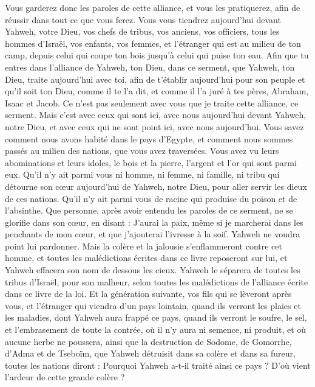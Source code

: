 \begin{multicols}{2}
Vous garderez donc les paroles de cette alliance, et vous les pratiquerez, afin de réussir dans tout ce que vous ferez.
Vous vous tiendrez aujourd'hui devant Yahweh, votre Dieu, vos chefs de tribus, vos anciens, vos officiers, tous les hommes d'Israël,
vos enfants, vos femmes, et l’étranger qui est au milieu de ton camp, depuis celui qui coupe ton bois jusqu'à celui qui puise ton eau.
Afin que tu entres dans l'alliance de Yahweh, ton Dieu, dans ce serment, que Yahweh, ton Dieu, traite aujourd'hui avec toi,
afin de t’établir aujourd'hui pour son peuple et qu'il soit ton Dieu, comme il te l’a dit, et comme il l’a juré à tes pères, Abraham, Isaac et Jacob.
Ce n'est pas seulement avec vous que je traite cette alliance, ce serment.
Mais c'est avec ceux qui sont ici, avec nous aujourd'hui devant Yahweh, notre Dieu, et avec ceux qui ne sont point ici, avec nous aujourd'hui.
Vous savez comment nous avons habité dans le pays d'Egypte, et comment nous sommes passés au milieu des nations, que vous avez traversées.
Vous avez vu leurs abominations et leurs idoles, le bois et la pierre, l'argent et l'or qui sont parmi eux.
Qu'il n'y ait parmi vous ni homme, ni femme, ni famille, ni tribu qui détourne son cœur aujourd'hui de Yahweh, notre Dieu, pour aller servir les dieux de ces nations. Qu'il n'y ait parmi vous de racine qui produise du poison et de l'absinthe.
Que personne, après avoir entendu les paroles de ce serment, ne se glorifie dans son cœur, en disant : J'aurai la paix, même si je marcherai dans les penchants de mon cœur, et que j’ajouterai l’ivresse à la soif.
Yahweh ne voudra point lui pardonner. Mais la colère et la jalousie s'enflammeront contre cet homme, et toutes les malédictions écrites dans ce livre reposeront sur lui, et Yahweh effacera son nom de dessous les cieux.
Yahweh le séparera de toutes les tribus d'Israël, pour son malheur, selon toutes les malédictions de l'alliance écrite dans ce livre de la loi.
Et la génération suivante, vos fils qui se lèveront après vous, et l’étranger qui viendra d'un pays lointain, quand ils verront les plaies et les maladies, dont Yahweh aura frappé ce pays,
quand ils verront le soufre, le sel, et l’embrasement de toute la contrée, où il n’y aura ni semence, ni produit, et où aucune herbe ne poussera, ainsi que la destruction de Sodome, de Gomorrhe, d'Adma et de Tseboïm, que Yahweh détruisit dans sa colère et dans sa fureur,
toutes les nations diront : Pourquoi Yahweh a-t-il traité ainsi ce pays ? D’où vient l’ardeur de cette grande colère ?

\end{multicols}
